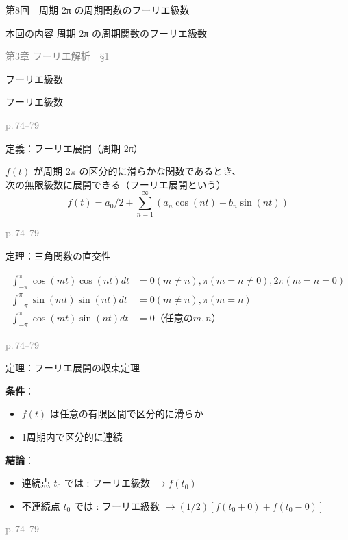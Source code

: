 \documentclass[aspectratio=43,professionalfonts,handout]{beamer}
\begin{document}
\begin{frame}{第8回　周期 2π の周期関数のフーリエ級数}
  \begin{block}{本回の内容}
  周期 2π の周期関数のフーリエ級数
  \end{block}
  \vfill\hfill{\scriptsize \textcolor{gray}{第3章 フーリエ解析　§1}}
\end{frame}

\begin{frame}{フーリエ級数}
  \begin{block}{}
  {\large フーリエ級数}
  \end{block}
  \vfill\hfill{\scriptsize \textcolor{gray}{p.\,74--79}}
\end{frame}

\begin{frame}{定義：フーリエ展開（周期 2π）}
  \begin{block}{}
  $f(t)$ が周期 $2\pi$ の区分的に滑らかな関数であるとき、\\[2pt]
  次の無限級数に展開できる（フーリエ展開という）\\[2pt]
  \[
    f(t) = a_{0}/2 + \sum_{n=1}^\infty (a_{n}\cos(nt) + b_{n}\sin(nt))
  \]
  \end{block}
  \vfill\hfill{\scriptsize \textcolor{gray}{p.\,74--79}}
\end{frame}

\begin{frame}{定理：三角関数の直交性}
  \begin{block}{}
  \begin{align*}
    \int_{-\pi}^{\pi} \cos(mt)\cos(nt) dt &= { 0 (m \neq n), \pi (m = n \neq 0), 2\pi (m = n = 0) } \\
    \int_{-\pi}^{\pi} \sin(mt)\sin(nt) dt &= { 0 (m \neq n), \pi (m = n) } \\
    \int_{-\pi}^{\pi} \cos(mt)\sin(nt) dt &= 0  （任意の m, n）
  \end{align*}
  \end{block}
  \vfill\hfill{\scriptsize \textcolor{gray}{p.\,74--79}}
\end{frame}

\begin{frame}{定理：フーリエ展開の収束定理}
  \begin{block}{}
  \textbf{条件}：
  \begin{itemize}
    \item $f(t)$ は任意の有限区間で区分的に滑らか
    \item 1周期内で区分的に連続
  \end{itemize}
  \textbf{結論}：
  \begin{itemize}
    \item 連続点 $t_{0}$ では : フーリエ級数 $ \to f(t_{0})$
    \item 不連続点 $t_{0}$ では : フーリエ級数 $ \to (1/2)[f(t_{0}+0) + f(t_{0}-0)]$
  \end{itemize}
  \end{block}
  \vfill\hfill{\scriptsize \textcolor{gray}{p.\,74--79}}
\end{frame}
\end{document}
